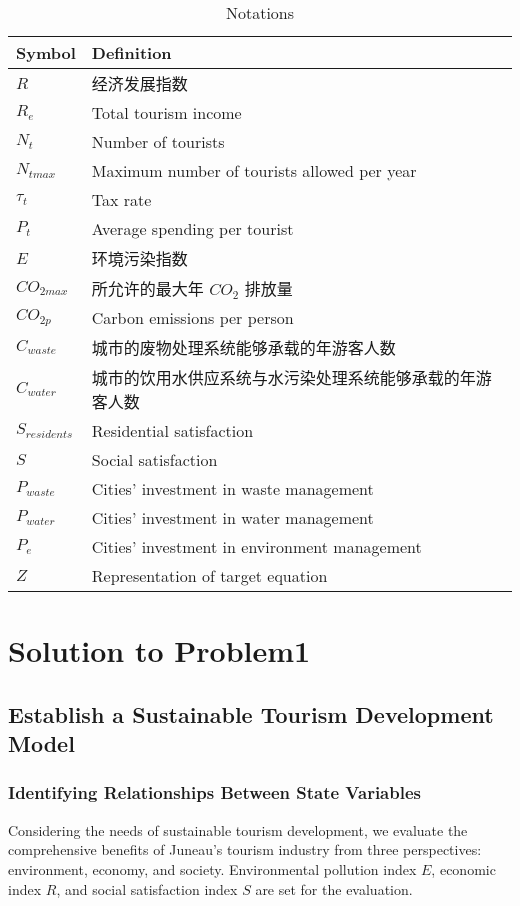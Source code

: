 \documentclass[12pt]{article}  %
\begin{document}
\begin{table}[H]
\begin{center}
\caption{Notations}
\begin{tabular}{>{\centering\arraybackslash}m{4cm} >{\centering\arraybackslash}m{10cm}}
	\toprule
		Symbol & Definition \\
	\midrule
		\(R\) & 经济发展指数 \\
	    \(R_{e}\) & Total tourism income \\
		\(N_{t}\) & Number of tourists \\
		\(N_{tmax}\) & Maximum number of tourists allowed per year \\
		\(\tau_{t}\) & Tax rate \\
		\(P_{t}\) & Average spending per tourist \\
		\(E\) & 环境污染指数 \\
		\(CO_{2max}\) & 所允许的最大年 \(CO_{2}\) 排放量 \\
		\(CO_{2p}\) & Carbon emissions per person \\
		\(C_{waste}\) & 城市的废物处理系统能够承载的年游客人数 \\
		\(C_{water}\) & 城市的饮用水供应系统与水污染处理系统能够承载的年游客人数 \\
		\(S_{residents}\) & Residential satisfaction \\
		\(S\) & Social satisfaction \\
		\(P_{waste}\) & Cities' investment in waste management \\
		\(P_{water}\) & Cities' investment in water management \\
		\(P_{e}\) & Cities' investment in environment management \\
		\(Z\) & Representation of target equation\\
	\bottomrule
\end{tabular}\label{tb:notation}
\end{center}
\end{table}

\section{Solution to Problem1}
\subsection{Establish a Sustainable Tourism Development Model}
\subsubsection{Identifying Relationships Between State Variables}
Considering the needs of sustainable tourism development, we evaluate the comprehensive benefits of Juneau's tourism industry from three perspectives: environment, economy, and society. Environmental pollution index $E$, economic index $R$, and social satisfaction index $S$ are set for the evaluation.
\end{document}
